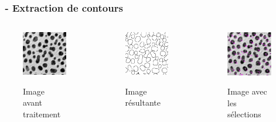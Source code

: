 \documentclass[11pt]{beamer}
\begin{document}
\begin{frame}
\frametitle{\subsecname ~- Extraction de contours}
\begin{columns}
		\begin{column}{3cm}
			\begin{figure}
				\includegraphics[scale=0.33]{blobs.png}

				Image avant traitement
			\end{figure}
		\end{column}
		\begin{column}{3cm}
			\begin{figure}
				\includegraphics[scale=0.33]{blobDilateDiffResult.png}

				Image résultante
			\end{figure}
		\end{column}
		\begin{column}{3cm}
			\begin{figure}
				\includegraphics[scale=0.33]{blobDilate.png}

				Image avec les sélections
			\end{figure}
		\end{column}
	\end{columns}
\end{frame}
\end{document}
